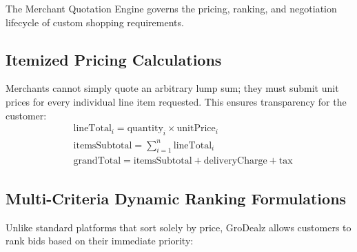 The Merchant Quotation Engine governs the pricing, ranking, and negotiation lifecycle of custom shopping requirements.

\subsection{Itemized Pricing Calculations}
Merchants cannot simply quote an arbitrary lump sum; they must submit unit prices for every individual line item requested. This ensures transparency for the customer:
\begin{align}
    &\text{lineTotal}_i = \text{quantity}_i \times \text{unitPrice}_i \\
    &\text{itemsSubtotal} = \sum_{i=1}^n \text{lineTotal}_i \\
    &\text{grandTotal} = \text{itemsSubtotal} + \text{deliveryCharge} + \text{tax}
\end{align}

\subsection{Multi-Criteria Dynamic Ranking Formulations}
Unlike standard platforms that sort solely by price, GroDealz allows customers to rank bids based on their immediate priority:

